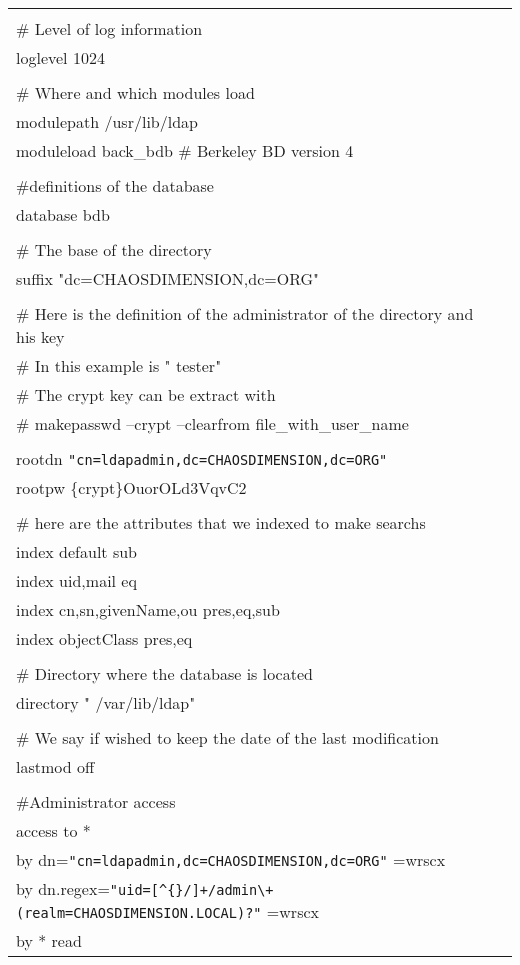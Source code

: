 \begin{center}
\begin{longtable}{|ll|}
 & \\
\# Level of log information & \\
loglevel        1024 & \\
 & \\
\# Where and which modules load & \\
modulepath      /usr/lib/ldap & \\
moduleload      back\_bdb \# Berkeley BD version 4 & \\
 & \\
\#definitions of the database & \\
database        bdb & \\
 & \\
\# The base of the directory & \\
suffix          "dc=CHAOSDIMENSION,dc=ORG"  & \\
 & \\
\# Here is the definition of the administrator of the directory and his key & \\
\# In this example is " tester"  & \\
\# The crypt key can be extract with  & \\
\# makepasswd --crypt --clearfrom file\_with\_user\_name & \\
 & \\
rootdn  \verb|"cn=ldapadmin,dc=CHAOSDIMENSION,dc=ORG"|  & \\
rootpw  \{crypt\}OuorOLd3VqvC2 & \\
 & \\
\# here are the attributes that we indexed to make searchs & \\
index   default                                                sub & \\
index   uid,mail                                               eq & \\
index   cn,sn,givenName,ou                                     pres,eq,sub & \\
index   objectClass                                            pres,eq & \\
 & \\
\# Directory where the database is located & \\
directory       " /var/lib/ldap"  & \\
 & \\
\# We say if wished to keep the date of the last modification & \\
lastmod off & \\
 & \\
\#Administrator access & \\
access to * & \\
        by dn=\verb|"cn=ldapadmin,dc=CHAOSDIMENSION,dc=ORG"| =wrscx & \\
        by dn.regex=\verb|"uid=[^{}/]+/admin\+(realm=CHAOSDIMENSION.LOCAL)?"| =wrscx & \\
        by * read & \\
\end{longtable}
\end{center}

